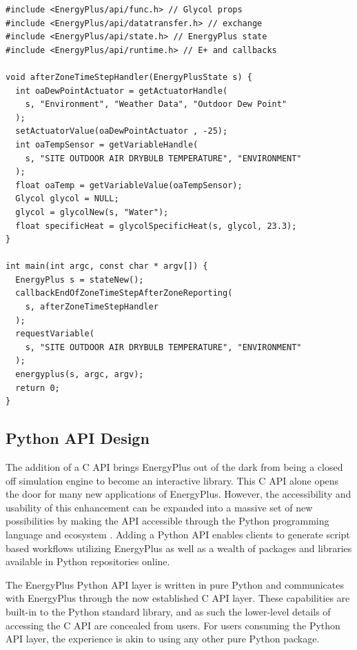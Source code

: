 \documentclass[5p, authoryear]{elsarticle}
\begin{document}
\lstset{language=c}
\begin{lstlisting}
#include <EnergyPlus/api/func.h> // Glycol props
#include <EnergyPlus/api/datatransfer.h> // exchange 
#include <EnergyPlus/api/state.h> // EnergyPlus state
#include <EnergyPlus/api/runtime.h> // E+ and callbacks

void afterZoneTimeStepHandler(EnergyPlusState s) {
  int oaDewPointActuator = getActuatorHandle(
    s, "Environment", "Weather Data", "Outdoor Dew Point"
  );
  setActuatorValue(oaDewPointActuator , -25);
  int oaTempSensor = getVariableHandle(
    s, "SITE OUTDOOR AIR DRYBULB TEMPERATURE", "ENVIRONMENT"
  );
  float oaTemp = getVariableValue(oaTempSensor);
  Glycol glycol = NULL;
  glycol = glycolNew(s, "Water");
  float specificHeat = glycolSpecificHeat(s, glycol, 23.3);
}

int main(int argc, const char * argv[]) {
  EnergyPlus s = stateNew();
  callbackEndOfZoneTimeStepAfterZoneReporting(
    s, afterZoneTimeStepHandler
  );
  requestVariable(
    s, "SITE OUTDOOR AIR DRYBULB TEMPERATURE", "ENVIRONMENT"
  );
  energyplus(s, argc, argv);
  return 0;
}
\end{lstlisting}

  \subsection{Python API Design}
The addition of a C API brings EnergyPlus out of the dark from being a closed off simulation engine to become an interactive library.  This C API alone opens the door for many new applications of EnergyPlus. However, the accessibility and usability of this enhancement can be expanded into a massive set of new possibilities by making the API accessible through the Python programming language and ecosystem \citep{Rossum}.  Adding a Python API enables clients to generate script based workflows utilizing EnergyPlus as well as a wealth of packages and libraries available in Python repositories online.

The EnergyPlus Python API layer is written in pure Python and communicates with EnergyPlus through the now established C API layer.  These capabilities are built-in to the Python standard library, and as such the lower-level details of accessing the C API are concealed from users.  For users consuming the Python API layer, the experience is akin to using any other pure Python package.
\end{document}
